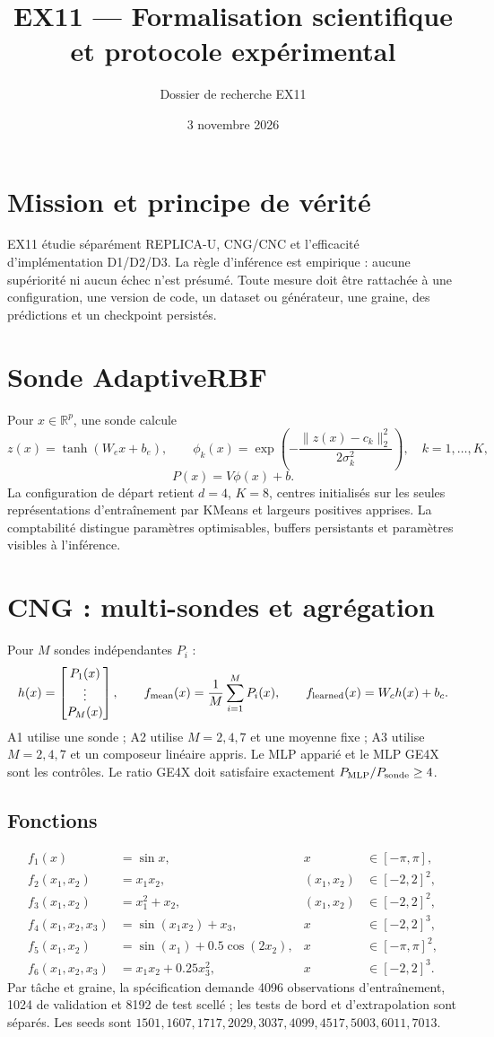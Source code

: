 \documentclass[11pt,a4paper]{article}
\title{EX11 — Formalisation scientifique et protocole expérimental}
\author{Dossier de recherche EX11}
\date{3 novembre 2026}
\begin{document}
\maketitle
\tableofcontents
\section{Mission et principe de vérité}
EX11 étudie séparément REPLICA-U, CNG/CNC et l'efficacité d'implémentation D1/D2/D3. La règle d'inférence est empirique : aucune supériorité ni aucun échec n'est présumé. Toute mesure doit être rattachée à une configuration, une version de code, un dataset ou générateur, une graine, des prédictions et un checkpoint persistés.
\section{Sonde AdaptiveRBF}
Pour $x\in\mathbb R^p$, une sonde calcule
\[
z(x)=\tanh(W_ex+b_e),\qquad
\phi_k(x)=\exp\left(-\frac{\|z(x)-c_k\|_2^2}{2\sigma_k^2}\right),\quad k=1,\ldots,K,
\]
\[
P(x)=V\phi(x)+b.
\]
La configuration de départ retient $d=4$, $K=8$, centres initialisés sur les seules représentations d'entraînement par KMeans et largeurs positives apprises. La comptabilité distingue paramètres optimisables, buffers persistants et paramètres visibles à l'inférence.
\section{CNG : multi-sondes et agrégation}
Pour $M$ sondes indépendantes $P_i$ :
\[
h(x)=\begin{bmatrix}P_1(x)\\\vdots\\P_M(x)\end{bmatrix},\qquad
f_{\rm mean}(x)=\frac{1}{M}\sum_{i=1}^M P_i(x),\qquad
f_{\rm learned}(x)=W_ch(x)+b_c.
\]
A1 utilise une sonde ; A2 utilise $M=2,4,7$ et une moyenne fixe ; A3 utilise $M=2,4,7$ et un composeur linéaire appris. Le MLP apparié et le MLP GE4X sont les contrôles. Le ratio GE4X doit satisfaire exactement $P_{\rm MLP}/P_{\rm sonde}\geq4$.
\subsection{Fonctions}
\begin{align*}
f_1(x)&=\sin x, & x&\in[-\pi,\pi],\\
f_2(x_1,x_2)&=x_1x_2, & (x_1,x_2)&\in[-2,2]^2,\\
f_3(x_1,x_2)&=x_1^2+x_2, & (x_1,x_2)&\in[-2,2]^2,\\
f_4(x_1,x_2,x_3)&=\sin(x_1x_2)+x_3, & x&\in[-2,2]^3,\\
f_5(x_1,x_2)&=\sin(x_1)+0.5\cos(2x_2), & x&\in[-\pi,\pi]^2,\\
f_6(x_1,x_2,x_3)&=x_1x_2+0.25x_3^2, & x&\in[-2,2]^3.
\end{align*}
Par tâche et graine, la spécification demande 4096 observations d'entraînement, 1024 de validation et 8192 de test scellé ; les tests de bord et d'extrapolation sont séparés. Les seeds sont $1501,1607,1717,2029,3037,4099,4517,5003,6011,7013$.
\end{document}
